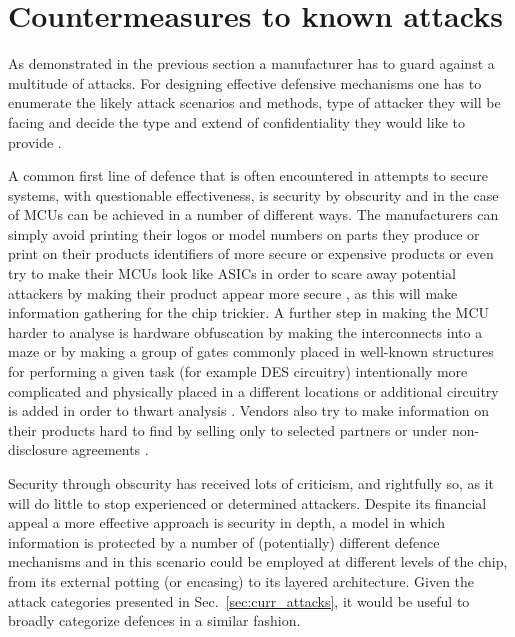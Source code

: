\section{Countermeasures to known attacks}
\label{sec:defences}

As demonstrated in the previous section a manufacturer has to guard against a multitude of attacks. For designing effective defensive mechanisms one has to enumerate the likely attack scenarios and methods, type of attacker they will be facing and decide the type and extend of confidentiality they would like to provide \citep{sergei:thesis} \citep{kocher:DPA}.

A common first line of defence that is often encountered in attempts to secure systems, with questionable effectiveness, is security by obscurity and in the case of MCUs can be achieved in a number of different ways. The manufacturers can simply avoid printing their logos or model numbers on parts they produce or print on their products identifiers of more secure or expensive products or even try to make their MCUs look like ASICs in order to scare away potential attackers by making their product appear more secure \citep{sergei:thesis} \citep{hwre}, as this will make information gathering for the chip trickier. A further step in making the MCU harder to analyse is hardware obfuscation by making the interconnects into a maze \citep{hwre} or by making a group of gates commonly placed in well-known structures for performing a given task (for example DES circuitry) intentionally more complicated and physically placed in a different locations or additional circuitry is added in order to thwart analysis \citep{anderson:cautionary_note}. Vendors also try to make information on their products hard to find by selling only to selected partners or under non-disclosure agreements \citep{sergei:thesis}.

Security through obscurity has received lots of criticism, and rightfully so, as it will do little to stop experienced or determined attackers. Despite its financial appeal a more effective approach is security in depth, a model in which information is protected by a number of (potentially) different defence mechanisms and in this scenario could be employed at different levels of the chip, from its external potting (or encasing) to its layered architecture. Given the attack categories presented in Sec.~\ref{sec:curr_attacks}, it would be useful to broadly categorize defences in a similar fashion.

